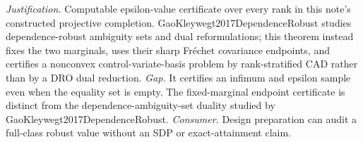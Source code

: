 \documentclass{article}
\begin{document}
\par\smallskip\noindent \textit{Justification.} Computable epsilon-value certificate over every rank in this note's constructed projective completion.  GaoKleywegt2017DependenceRobust studies dependence-robust ambiguity sets and dual reformulations; this theorem instead fixes the two marginals, uses their sharp Fréchet covariance endpoints, and certifies a nonconvex control-variate-basis problem by rank-stratified CAD rather than by a DRO dual reduction. \textit{Gap.} It certifies an infimum and epsilon sample even when the equality set is empty.  The fixed-marginal endpoint certificate is distinct from the dependence-ambiguity-set duality studied by GaoKleywegt2017DependenceRobust. \textit{Consumer.} Design preparation can audit a full-class robust value without an SDP or exact-attainment claim.
\end{document}
